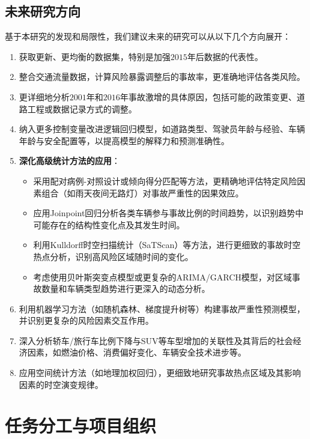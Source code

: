 \documentclass[12pt,a4paper]{article}
\begin{document}
\subsection{未来研究方向}

基于本研究的发现和局限性，我们建议未来的研究可以从以下几个方向展开：

\begin{enumerate}
\item 获取更新、更均衡的数据集，特别是加强$2015$年后数据的代表性。
\item 整合交通流量数据，计算风险暴露调整后的事故率，更准确地评估各类风险。
\item 更详细地分析$2001$年和$2016$年事故激增的具体原因，包括可能的政策变更、道路工程或数据记录方式的调整。
\item 纳入更多控制变量改进逻辑回归模型，如道路类型、驾驶员年龄与经验、车辆年龄与安全配置等，以提高模型的解释力和预测准确性。
\item \textbf{深化高级统计方法的应用}：
    \begin{itemize}
    \item 采用配对病例-对照设计或倾向得分匹配等方法，更精确地评估特定风险因素组合（如雨天夜间无路灯）对事故严重性的因果效应。
    \item 应用Joinpoint回归分析各类车辆参与事故比例的时间趋势，以识别趋势中可能存在的结构性变化点及其发生时间。
    \item 利用Kulldorff时空扫描统计（SaTScan）等方法，进行更细致的事故时空热点分析，识别高风险区域随时间的变化。
    \item 考虑使用贝叶斯突变点模型或更复杂的ARIMA/GARCH模型，对区域事故数量和车辆类型趋势进行更深入的动态分析。
    \end{itemize}
\item 利用机器学习方法（如随机森林、梯度提升树等）构建事故严重性预测模型，并识别更复杂的风险因素交互作用。
\item 深入分析轿车/旅行车比例下降与SUV等车型增加的关联性及其背后的社会经济因素，如燃油价格、消费偏好变化、车辆安全技术进步等。
\item 应用空间统计方法（如地理加权回归），更细致地研究事故热点区域及其影响因素的时空演变规律。
\end{enumerate}

\clearpage
{}
{}
\renewcommand{\bibname}{参考文献}
\nocite{*}


\clearpage
{}
{}
\appendix
\section{任务分工与项目组织}
\end{document}
